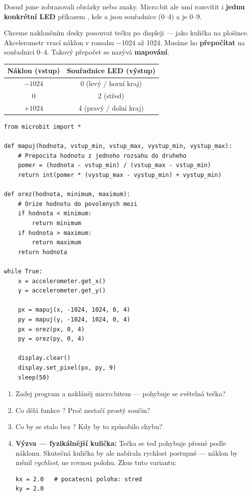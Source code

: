 \begin{bonusukol}

Dosud jsme zobrazovali obrázky nebo znaky. Micro:bit ale umí rozsvítit
i \textbf{jednu konkrétní LED} příkazem ,
kde  a  jsou souřadnice (0–4) a  je 0–9.

\medskip\noindent
Chceme nakloněním desky posouvat tečku po displeji — jako kulička na plošince.
Akcelerometr vrací náklon v rozsahu −1024 až 1024. Musíme ho \textbf{přepočítat}
na souřadnici 0–4. Takový přepočet se nazývá \textbf{mapování}.

\medskip
\begin{center}
\begin{tabular}{cc}
  \toprule
  \textbf{Náklon (vstup)} & \textbf{Souřadnice LED (výstup)} \\
  \midrule
  $-1024$ & 0 \quad (levý / horní kraj) \\
  $0$     & 2 \quad (střed) \\
  $+1024$ & 4 \quad (pravý / dolní kraj) \\
  \bottomrule
\end{tabular}
\end{center}

\begin{lstlisting}
from microbit import *

def mapuj(hodnota, vstup_min, vstup_max, vystup_min, vystup_max):
    # Prepocita hodnotu z jednoho rozsahu do druheho
    pomer = (hodnota - vstup_min) / (vstup_max - vstup_min)
    return int(pomer * (vystup_max - vystup_min) + vystup_min)

def orez(hodnota, minimum, maximum):
    # Orize hodnotu do povolenych mezi
    if hodnota < minimum:
        return minimum
    if hodnota > maximum:
        return maximum
    return hodnota

while True:
    x = accelerometer.get_x()
    y = accelerometer.get_y()

    px = mapuj(x, -1024, 1024, 0, 4)
    py = mapuj(y, -1024, 1024, 0, 4)
    px = orez(px, 0, 4)
    py = orez(py, 0, 4)

    display.clear()
    display.set_pixel(px, py, 9)
    sleep(50)
\end{lstlisting}

\begin{enumerate}
  \item Zadej program a nakláněj micro:bitem — pohybuje se světelná tečka?
  \item Co dělá funkce ? Proč nestačí prostý součin?
  \item Co by se stalo bez ? Kdy by to způsobilo chybu?
  \item \textbf{Výzva — fyzikálnější kulička:}
        Tečka se teď pohybuje přesně podle náklonu.
        Skutečná kulička by ale nabírala rychlost postupně — náklon by měnil \emph{rychlost},
        ne rovnou polohu. Zkus tuto variantu:
\begin{lstlisting}
kx = 2.0   # pocatecni poloha: stred
ky = 2.0


\end{lstlisting}
\end{enumerate}
\end{bonusukol}
